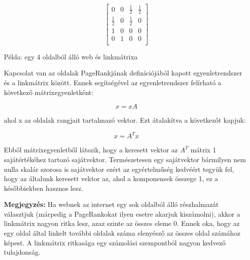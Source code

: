 \documentclass[12pt,a4paper]{article}
\begin{document}
\begin{minipage}{0.4\textwidth}
	\begin{center}
	\end{center}
\end{minipage}
\begin{minipage}{0.5\textwidth}
	\begin{center}
		\[
	  \begin{bmatrix}
	  	0 & 0 & \frac{1}{2} & \frac{1}{2} \\  
	  	\frac{1}{2} & 0 & \frac{1}{2} & 0 \\
	  	1 & 0 & 0 & 0 \\
	    0 & 1 & 0 & 0 \\
	  \end{bmatrix}
	  \]
	\end{center}
\end{minipage}

\bigskip
\centerline{Példa: egy 4 oldalból álló web és linkmátrixa}
\bigskip

Kapcsolat van az oldalak PageRankjának definíciójából kapott egyenletrendszer és a linkmátrix között. Ennek segítségével az egyenletrendszer felírható a következő mátrixegyenletként:

\[ x = x A \]

ahol x az oldalak rangjait tartalmazó vektor. Ezt átalakítva a következőt kapjuk:

\[ x = A^T x \]

Ebből mátrixegyenletből látszik, hogy a keresett vektor az $A^T$ mátrix 1 sajátértékéhez tartozó sajátvektor. Természetesen egy sajátvektor bármilyen nem nulla skalár szorosa is sajátvektor ezért az egyértelműség kedvéért tegyük fel, hogy az általunk keresett vektor az, ahol a komponensek összege 1, ez a későbbiekben hasznos lesz.

\vspace{0.1cm}
\textbf{Megjegyzés:} Ha webnek az internet egy sok oldalból álló részhalmazát választjuk (márpedig a PageRankokat ilyen esetre akarjuk kiszámolni), akkor a linkmátrix nagyon ritka lesz, azaz szinte az összes eleme 0. Ennek oka, hogy az egy oldal által linkelt további oldalak száma elenyésző az összes oldal számához képest. A linkmátrix ritkasága egy számolási szempontból nagyon kedvező tulajdonság. 
\end{document}
